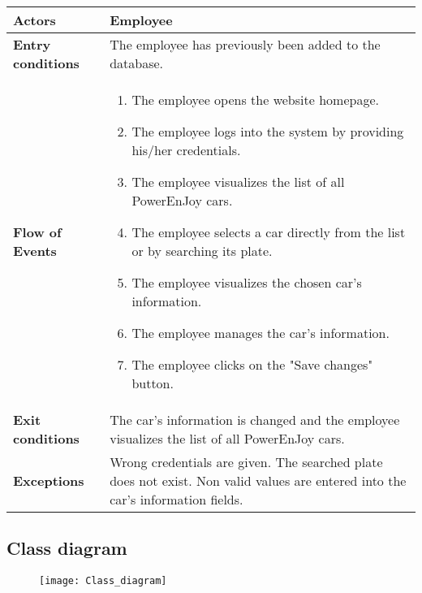 \begin{itemize}
\begin{table}[H]
\begin{tabular}{| m{3.5cm} | m{9.5cm} |}
		\hline
		\textbf{Actors} & Employee\\
		\hline
		\textbf{Entry conditions} & The employee has previously been added to the database.\\
		\hline
		\textbf{Flow of Events} & 
		\begin{enumerate}
			\item The employee opens the website homepage.
			\item The employee logs into the system by providing his/her credentials.
			\item The employee visualizes the list of all PowerEnJoy cars.
			\item The employee selects a car directly from the list or by searching its plate.
			\item The employee visualizes the chosen car's information.
			\item The employee manages the car's information. 
			\item The employee clicks on the "Save changes" button.  
		\end{enumerate} \\
		\hline
		\textbf{Exit conditions} & The car's information is changed and the employee visualizes the list of all PowerEnJoy cars.\\
		\hline
		\textbf{Exceptions} & Wrong credentials are given. The searched plate does not exist. Non valid values are entered into the car's information fields.\\
		\hline
	\end{tabular}
\end{table}
\end{itemize}
\subsection{Class diagram}
\begin{figure}[H]
	\centering
	\texttt{[image: Class\_diagram]}
\end{figure}

